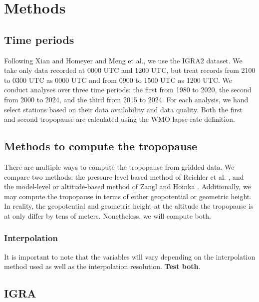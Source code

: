 \documentclass[fleqn,10pt]{wlscirep}
\begin{document}
\section{Methods}
\subsection*{Time periods}
Following Xian and Homeyer\cite{xian2019global} and Meng et al.\cite{meng2021continuous}, we use the IGRA2 dataset. We take only data recorded at 0000 UTC and 1200 UTC, but treat records from 2100 to 0300 UTC as 0000 UTC and from 0900 to 1500 UTC as 1200 UTC. We conduct analyses over three time periods: the first from 1980 to 2020, the second from 2000 to 2024, and the third from 2015 to 2024. For each analysis, we hand select stations based on their data availability and data quality. Both the first and second tropopause are calculated using the WMO lapse-rate definition. 
\subsection*{Methods to compute the tropopause}
There are multiple ways to compute the tropopause from gridded data. We compare two methods: the pressure-level based method of Reichler et al. \cite{reichler2003determining}, and the model-level or altitude-based method of Zangl and Hoinka \cite{zangl2001tropopause}. Additionally, we may compute the tropopause in terms of either geopotential or geometric height. In reality, the geopotential and geometric height at the altitude the tropopause is at only differ by tens of meters. Nonetheless, we will compute both. 
\subsubsection*{Interpolation}
It is important to note that the variables will vary depending on the interpolation method used as well as the interpolation resolution. \textbf{Test both}.








\subsection{IGRA \cite{durre2006overview}} 
\end{document}
